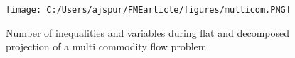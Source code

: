 \begin{figure}
	\centering
		\texttt{[image: C:/Users/ajspur/FMEarticle/figures/multicom.PNG]}
	\caption{Number of inequalities and variables during flat and decomposed projection of a multi commodity flow problem}
	\label{fig:multicom}
\end{figure}


%




%
